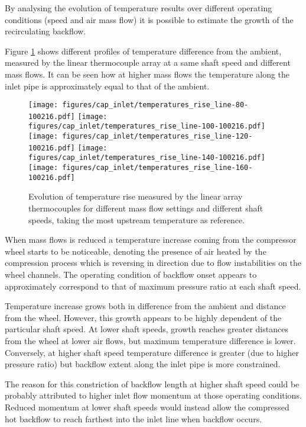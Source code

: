 By analysing the evolution of temperature results over different operating conditions (speed and air mass flow) it is possible to estimate the growth of the recirculating backflow.

Figure \ref{fig:temp_line_linear} shows different profiles of temperature difference from the ambient, measured by the linear thermocouple array at a same shaft speed and different mass flows. It can be seen how at higher mass flows the temperature along the inlet pipe is approximately equal to that of the ambient.

\begin{figure}[htb!]
\centering
\texttt{[image: figures/cap\_inlet/temperatures\_rise\_line-80-100216.pdf]}
\texttt{[image: figures/cap\_inlet/temperatures\_rise\_line-100-100216.pdf]}\\[4mm]
\texttt{[image: figures/cap\_inlet/temperatures\_rise\_line-120-100216.pdf]}
\texttt{[image: figures/cap\_inlet/temperatures\_rise\_line-140-100216.pdf]}\\[4mm]
\texttt{[image: figures/cap\_inlet/temperatures\_rise\_line-160-100216.pdf]}
\caption{Evolution of temperature rise measured by the linear array thermocouples for different mass flow settings and different shaft speeds, taking the most upstream temperature as reference.}
\label{fig:temp_line_linear}
\end{figure}

When mass flows is reduced a temperature increase coming from the compressor wheel starts to be noticeable, denoting the presence of air heated by the compression process which is reversing in direction due to flow instabilities on the wheel channels. The operating condition of backflow onset appears to approximately correspond to that of maximum pressure ratio at each shaft speed.

Temperature increase grows both in difference from the ambient and distance from the wheel. However, this growth appears to be highly dependent of the particular shaft speed. At lower shaft speeds, growth reaches greater distances from the wheel at lower air flows, but maximum temperature difference is lower. Conversely, at higher shaft speed temperature difference is greater (due to higher pressure ratio) but backflow extent along the inlet pipe is more constrained.

The reason for this constriction of backflow length at higher shaft speed could be probably attributed to higher inlet flow momentum at those operating conditions. Reduced momentum at lower shaft speeds would instead allow the compressed hot backflow to reach farthest into the inlet line when backflow occurs. 

